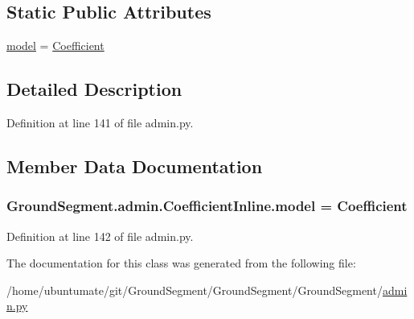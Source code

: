 \subsection*{Static Public Attributes}
\begin{DoxyCompactItemize}
\item 
\hyperlink{class_ground_segment_1_1admin_1_1_coefficient_inline_adb66bbee5f33dfba2c48c78fe24049f5}{model} = \hyperlink{class_ground_segment_1_1models_1_1_coefficient_1_1_coefficient}{Coefficient}
\end{DoxyCompactItemize}


\subsection{Detailed Description}


Definition at line 141 of file admin.\+py.



\subsection{Member Data Documentation}
\hypertarget{class_ground_segment_1_1admin_1_1_coefficient_inline_adb66bbee5f33dfba2c48c78fe24049f5}{}
\subsubsection[{model}]{\setlength{\rightskip}{0pt plus 5cm}Ground\+Segment.\+admin.\+Coefficient\+Inline.\+model = {\bf Coefficient}\hspace{0.3cm}{\ttfamily [static]}}\label{class_ground_segment_1_1admin_1_1_coefficient_inline_adb66bbee5f33dfba2c48c78fe24049f5}


Definition at line 142 of file admin.\+py.



The documentation for this class was generated from the following file\+:\begin{DoxyCompactItemize}
\item 
/home/ubuntumate/git/\+Ground\+Segment/\+Ground\+Segment/\+Ground\+Segment/\hyperlink{admin_8py}{admin.\+py}\end{DoxyCompactItemize}

